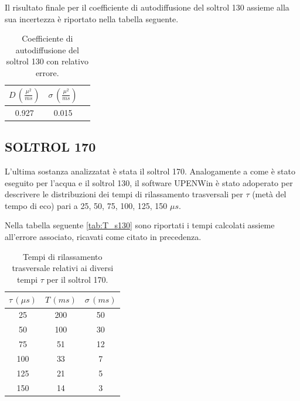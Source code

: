Il risultato finale per il coefficiente di autodiffusione del soltrol 130 assieme alla sua incertezza è riportato nella tabella seguente.

\begin{table}[h!]
    \begin{center}
    \begin{tabular}{c c c}
    \toprule
    	$D\,(\frac{{\mu}^2}{ms})$ & $\sigma\,(\frac{{\mu}^2}{ms})$ \\
    \midrule
    	0.927	&	0.015	\\
    \bottomrule
    \end{tabular}
    \caption{Coefficiente di autodiffusione del soltrol 130 con relativo errore.}
    \label{tab:Df_s130}
    \end{center}
\end{table}


\subsection*{SOLTROL 170}

L'ultima sostanza analizzatat è stata il soltrol 170.
Analogamente a come è stato eseguito per l'acqua e il soltrol 130, il software UPENWin è stato adoperato per descrivere le distribuzioni dei tempi di rilassamento trasversali per $\tau$ (metà del tempo di eco) pari a 25, 50, 75, 100, 125, 150 ${\mu}s$.

Nella tabella seguente \ref{tab:T_s130} sono riportati i tempi calcolati assieme all'errore associato, ricavati come citato in precedenza.

\begin{table}[ht]
    \begin{center}
    \begin{tabular}{c c c}
    \toprule
    	${\tau}\,({\mu}s)$ & $T\,(ms)$ & ${\sigma}\,(ms)$ \\
    \midrule
	 25 & 200 & 50 \\
	 50 & 100 & 30 \\
	 75 & 51 & 12 \\
	 100 & 33 & 7 \\
	 125 & 21 & 5 \\
	 150 & 14 & 3 \\
    \bottomrule
    \end{tabular}
    \caption{Tempi di rilassamento trasversale relativi ai diversi tempi $\tau$ per il soltrol 170.}
    \label{tab:T_s170}
    \end{center}
\end{table}

